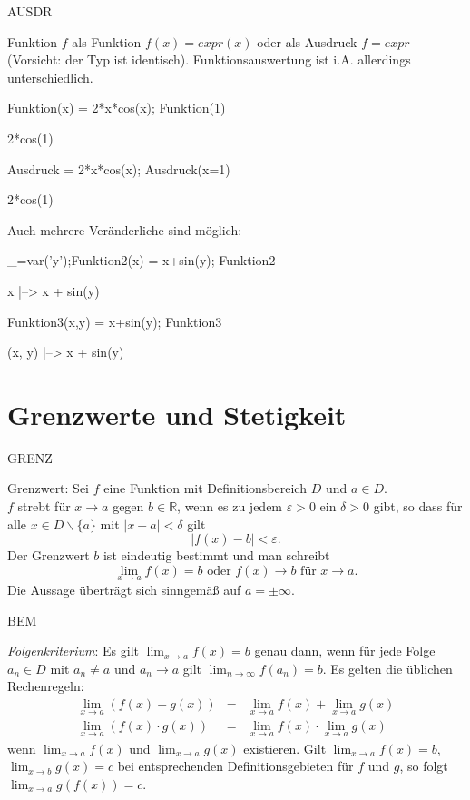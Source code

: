 \documentclass[fontsize=12pt,paper=a4,twoside,bibtotoc,idxtotoc,
liststotoc,pagesize,BCOR1.2cm,DIV15,chapterprefix,pagesize=pdftex]{scrbook}
\theoremstyle{plain}
\theoremstyle{definition}
\theoremstyle{remark}
\begin{document}
AUSDR

Funktion $f$ als Funktion $f(x)=expr(x)$ oder als Ausdruck $f=expr$ (Vorsicht: der Typ ist identisch).
Funktionsauswertung ist i.A. allerdings unterschiedlich.
\begin{sagein}
Funktion(x) = 2*x*cos(x); Funktion(1)
\end{sagein}
\begin{sage}
  2*cos(1)
\end{sage}
\begin{sagein}
Ausdruck = 2*x*cos(x); Ausdruck(x=1)
\end{sagein}
\begin{sage}
  2*cos(1)
\end{sage}
Auch mehrere Veränderliche  sind möglich:
\begin{sagein}
_=var('y');Funktion2(x) = x+sin(y); Funktion2
\end{sagein}
\begin{sage}
 x |--> x + sin(y)
\end{sage}
\begin{sagein}
Funktion3(x,y) = x+sin(y); Funktion3
\end{sagein}
\begin{sage}
  (x, y) |--> x + sin(y)
\end{sage}

\section{Grenzwerte und Stetigkeit}

GRENZ

{\color{red} Grenzwert}: Sei $f$ eine Funktion mit Definitionsbereich $D$ und $a\in D$.\\
$f$ strebt für $x \rightarrow a$ gegen $b \in \mathbb{R}$, wenn es zu jedem $\varepsilon >0$ ein $\delta >0$ gibt, so
dass für alle $x \in D\smallsetminus\{a \}$ mit $|x-a|<\delta$ gilt 
\[ |f(x)-b| < \varepsilon .\]
Der Grenzwert $b$ ist eindeutig bestimmt und man schreibt
\[ \lim_{x \rightarrow a} f(x) =b \mbox{ oder } f(x) \rightarrow b
\mbox{ für } x \rightarrow a. \]
Die Aussage überträgt sich sinngemäß auf $a=\pm \infty$.

BEM


 \emph{Folgenkriterium}: Es gilt $ \lim_{x \rightarrow a} f(x) =b$
genau dann, wenn für jede Folge $a_n \in D$ mit $a_n \neq a$ und $a_n \rightarrow a$
gilt $\lim_{n \rightarrow \infty} f(a_n)=b$.
 Es gelten die üblichen Rechenregeln:
\begin{eqnarray*}
\lim_{x \rightarrow a}(f(x)+g(x)) &=&\lim_{x \rightarrow a} f(x) +
\lim_{x \rightarrow a} g(x) \\
\lim_{x \rightarrow a}(f(x) \cdot g(x)) &=& \lim_{x \rightarrow a}
f(x) \cdot \lim_{x \rightarrow a} g(x)
\end{eqnarray*}
wenn $\lim_{x \rightarrow a} f(x)$ und $\lim_{x \rightarrow a}g(x)$
existieren. 
 Gilt $\lim_{x \rightarrow a} f(x)=b$, $\lim_{x \rightarrow b}
g(x)=c$ bei entsprechenden Definitionsgebieten für $f$ und $g$, so
folgt $\lim_{x \rightarrow a} g(f(x)) =c$.
\end{document}
